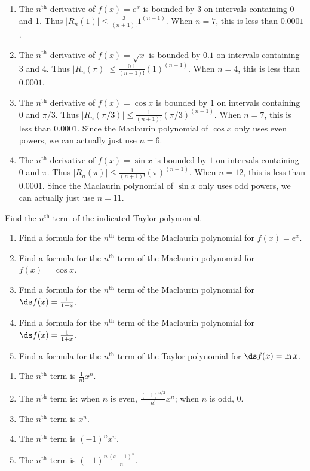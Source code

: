 \begin{enumialphparenastyle}
\begin{ex}
\begin{sol}
\begin{enumerate}
\item 
{The $n^\text{th}$ derivative of $f(x)=e^x$ is bounded by $3$ on intervals containing $0$ and 1. Thus $|R_n(1)|\leq \frac{3}{(n+1)!}1^{(n+1)}$. When $n=7$, this is less than $0.0001$. 
}
\item 
{The $n^\text{th}$ derivative of $f(x)=\sqrt x$ is bounded by $0.1$ on intervals containing $3$ and $4$. Thus $|R_n(\pi)|\leq \frac{0.1}{(n+1)!}(1)^{(n+1)}$. When $n=4$, this is less than $0.0001$.
}
\item 
{The $n^\text{th}$ derivative of $f(x)=\cos x$ is bounded by $1$ on intervals containing $0$ and $\pi/3$. Thus $|R_n(\pi/3)|\leq \frac{1}{(n+1)!}(\pi/3)^{(n+1)}$. When $n=7$, this is less than $0.0001$. Since the Maclaurin polynomial of $\cos x$ only uses even powers, we can actually just use $n=6$.
}
\item 
{The $n^\text{th}$ derivative of $f(x)=\sin x$ is bounded by $1$ on intervals containing $0$ and $\pi$. Thus $|R_n(\pi)|\leq \frac{1}{(n+1)!}(\pi)^{(n+1)}$. When $n=12$, this is less than $0.0001$. Since the Maclaurin polynomial of $\sin x$ only uses odd powers, we can actually just use $n=11$.
}
\end{enumerate}
\end{sol}

\end{ex}

\begin{ex}
Find the $n^\text{th}$ term of the indicated Taylor polynomial.
\begin{enumerate}
\item {Find a formula for the $n^\text{th}$ term of the Maclaurin polynomial for $f(x)=e^x$.
}
\item {Find a formula for the $n^\text{th}$ term of the Maclaurin polynomial for $f(x)=\cos x$.
}
\item {Find a formula for the $n^\text{th}$ term of the Maclaurin polynomial for $\ds f(x)=\frac{1}{1-x}$.
}
\item {Find a formula for the $n^\text{th}$ term of the Maclaurin polynomial for $\ds f(x)=\frac{1}{1+x}$.
}
\item {Find a formula for the $n^\text{th}$ term of the Taylor polynomial for $\ds f(x)=\ln x$.
}
\end{enumerate}

\begin{sol}
\begin{enumerate}
\item 
{The $n^\text{th}$ term is $\frac{1}{n!}x^n$.
}
\item 
{The $n^\text{th}$ term is: when $n$ is even,  $\frac{(-1)^{n/2}}{n!}x^n$; when $n$ is odd, $0$.
}
\item 
{The $n^\text{th}$ term is $x^n$.
}
\item 
{The $n^\text{th}$ term is $(-1)^nx^n$.
}
\item  
{The $n^\text{th}$ term is $(-1)^n\frac{(x-1)^n}{n}$.
}
\end{enumerate}
\end{sol}


\end{ex}
\end{enumialphparenastyle}
